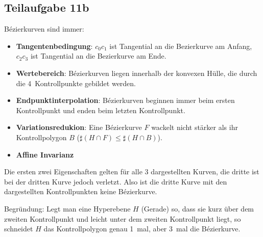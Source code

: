\documentclass[a4paper]{scrartcl}
\begin{document}
\subsection*{Teilaufgabe 11b}
Bézierkurven sind immer:

\begin{itemize}
    \item \textbf{Tangentenbedingung}:
          $c_0 c_1$ ist Tangential an die Bezierkurve am Anfang,
          $c_2 c_3$ ist Tangential an die Bezierkurve am Ende.
    \item \textbf{Wertebereich}: Bézierkurven liegen innerhalb der konvexen
          Hülle, die durch die 4~Kontrollpunkte gebildet werden.
    \item \textbf{Endpunktinterpolation}: Bézierkurven beginnen immer beim
          ersten Kontrollpunkt und enden beim letzten Kontrollpunkt.
    \item \textbf{Variationsredukion}: Eine Bézierkurve $F$ wackelt nicht stärker
          als ihr Kontrollpolygon $B$ ($\sharp (H \cap F) \leq \sharp (H \cap B)$).
    \item \textbf{Affine Invarianz}
\end{itemize}

Die ersten zwei Eigenschaften gelten für alle 3 dargestellten Kurven, die
dritte ist bei der dritten Kurve jedoch verletzt. Also ist die dritte Kurve
mit den dargestellten Kontrollpunkten keine Bézierkurve.

Begründung: Legt man eine Hyperebene $H$ (Gerade) so, dass sie kurz über dem
zweiten Kontrollpunkt und leicht unter dem zweiten Kontrollpunkt liegt, so
schneidet $H$ das Kontrollpolygon genau 1~mal, aber 3~mal die Bézierkurve.
\end{document}
